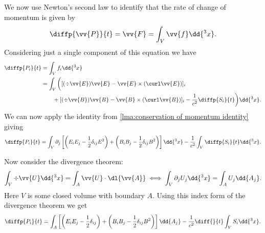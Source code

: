 We now use Newton's second law to identify that the rate of change of momentum is given by
\begin{equation}
    \diffp{\vv{P}}{t} = \vv{F} = \int_V \vv{f} \dd{^3x}.
\end{equation}
Considering just a single component of this equation we have
\begin{align}
    \diffp{P_i}{t} &= \int_V f_i \dd{^3x}\\
    &= \int_V \bigg( [(\div\vv{E})\vv{E} - \vv{E} \times (\curl \vv{E})]_i\notag\\
    &\qquad+ [(\div\vv{B})\vv{B} - \vv{B} \times (\curl \vv{B})]_i - \frac{1}{c^2}\diffp{S_i}{t} \bigg) \dd{^3x}.
\end{align}
We can now apply the identity from \cref{lma:conservation of momentum identity} giving
\begin{equation}
    \diffp{P_i}{t} = \int_V \partial_j \left[ \left( E_iE_j - \frac{1}{2}\delta_{ij}E^2 \right) + \left( B_iB_j - \frac{1}{2}\delta_{ij}B^2 \right) \right] \dd{^3x} - \frac{1}{c^2}\int_V \diffp{S_i}{t} \dd{^3x}.
\end{equation}

Now consider the divergence theorem:
\begin{equation}
    \int_V \div\vv{U} \dd{^3x} = \int_{A} \vv{U} \cdot \dl{\vv{A}} \iff \int_V \partial_jU_j \dd{^3x} = \int_{A} U_j \dd{A_j}.
\end{equation}
Here \(V\) is some closed volume with boundary \(A\).
Using this index form of the divergence theorem we get
\begin{equation}\label{eqn:rate of change of momentum}
    \diffp{P_i}{t} = \int_A \left[ \left( E_iE_j - \frac{1}{2}\delta_{ij} \right) + \left( B_iB_j - \frac{1}{2}\delta_{ij}B^2 \right) \right] \dd{A_j} - \frac{1}{c^2} \diff{}{t} \int_V S_i \dd{^3x}.
\end{equation}

